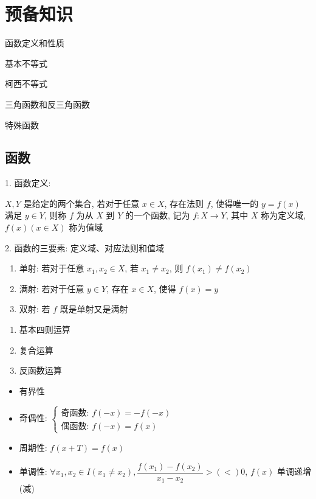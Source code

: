 \chapter{预备知识}
\begin{introduction}
	\item 函数定义和性质
	\item 基本不等式
	\item 柯西不等式
	\item 三角函数和反三角函数
	\item 特殊函数
\end{introduction}
\section{函数}
\begin{definition}[函数]
	1. 函数定义:
	
	$X,Y$ 是给定的两个集合, 若对于任意 $x\in X$, 存在法则 $f$, 使得唯一的 $y = f(x)$ 满足 $y\in Y$, 则称 $f$ 为从 $X$ 到 $Y$ 的一个函数, 记为 $f:X\to Y$, 其中 $X$ 称为定义域, $f(x)(x\in X)$ 称为值域
	
	2. 函数的三要素: 定义域、对应法则和值域
\end{definition}

\begin{definition}[函数的基本性质]
	\begin{enumerate}
		\item 单射: 若对于任意 $x_{1},x_{2}\in X$, 若 $x_{1}\neq x_{2}$, 则 $f(x_{1})\neq f(x_{2})$
		\item 满射: 若对于任意 $y\in Y$, 存在 $x\in X$, 使得 $f(x)=y$
		\item 双射: 若 $f$ 既是单射又是满射
	\end{enumerate}
\end{definition}

\begin{definition}[函数基本运算]
	\begin{enumerate}
		\item 基本四则运算
		\item 复合运算
		\item 反函数运算
	\end{enumerate}
\end{definition}

\begin{property}[函数四大性质]
	\begin{itemize}
		\item 有界性
		\item 奇偶性: $\begin{cases} \text{奇函数: }f(-x) = -f(-x) \\ \text{偶函数: }f(-x) = f(x) \end{cases}$
		\item 周期性: $f(x+T) = f(x)$
		\item 单调性: $\forall x_{1},x_{2}\in I (x_{1}\neq x_{2}),\dfrac{f(x_{1})-f(x_{2})}{x_{1}-x_{2}}>(<)0$, $f(x)$ 单调递增(减)
	\end{itemize}
\end{property}

